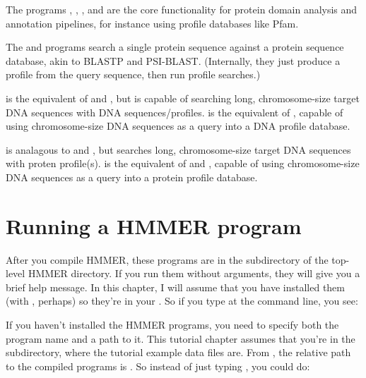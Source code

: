 The programs , , , and
 are the core functionality for protein domain analysis
and annotation pipelines, for instance using profile databases like
Pfam.

The  and  programs search a single
protein sequence against a protein sequence database, akin to BLASTP
and PSI-BLAST.  (Internally, they just produce a profile from the
query sequence, then run profile searches.)

 is the equivalent of  and ,
but is capable of searching long, chromosome-size target DNA
sequences with DNA sequences/profiles.  is the equivalent of
, capable of using chromosome-size DNA sequences as a query into a
DNA profile database.

 is analagous to  and ,
but searches long, chromosome-size target DNA
sequences with proten profile(s).   is the equivalent of
 and , capable of using chromosome-size DNA
sequences as a query into a protein profile database.



\section{Running a HMMER program}
\label{section:running}

After you compile HMMER, these programs are in the 
subdirectory of the top-level HMMER directory. If you run them without
arguments, they will give you a brief help message.  In this
chapter, I will assume that you have installed them (with , perhaps) so they're in your . So if you type
 at the command line, you see:

  \vspace{1ex}
  \vspace{-1ex}
  \vspace{-1ex}

If you haven't installed the HMMER programs, you need to specify both
the program name and a path to it. This tutorial chapter assumes
that you're in the  subdirectory, where the tutorial
example data files are. From  , the relative
path to the compiled programs is . So instead of just
typing , you could do: 

